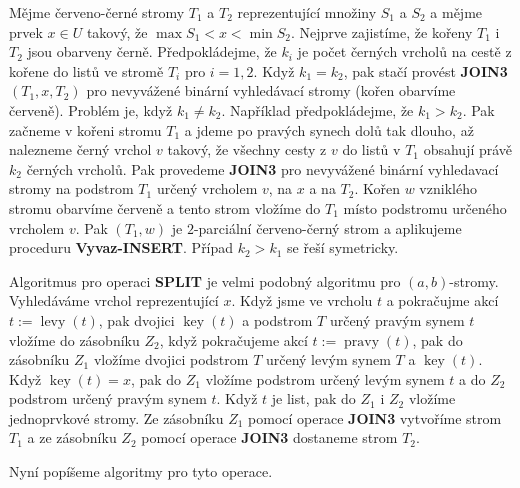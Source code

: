 \documentclass[a4paper,12pt]{article}
\DeclareMathOperator*{\levy}{levy}
\DeclareMathOperator*{\pravy}{pravy}
\DeclareMathOperator*{\key}{key}
\begin{document}
Mějme červeno-černé stromy $T_1$ a $T_2$ reprezentující 
množiny $S_1$ a $S_2$ a mějme prvek $x\in U$ takový, že 
$\max S_1<x<\min S_2$.  Nejprve zajistíme, že kořeny $T_
1$ i $T_2$ jsou 
obarveny černě.  Předpokládejme, že $k_i$ je počet černých 
vrcholů na cestě z kořene do listů ve stromě 
$T_i$ pro $i=1,2$.  Když $k_1=k_2$, pak stačí provést {\bf JOIN3$
(T_1,x,T_2)$ }
pro nevyvážené binární vyhledávací stromy (kořen obarvíme 
červeně).  Problém je, když $k_1\ne k_2$.  Například 
předpokládejme, že $k_1>k_2$.  Pak začneme v kořeni stromu $
T_1$ a 
jdeme po pravých synech dolů tak dlouho, až nalezneme 
černý vrchol $v$ takový, že všechny cesty z $v$ do listů 
v $T_1$ obsahují právě $k_2$ černých vrcholů.  Pak 
provedeme {\bf JOIN3} pro nevyvážené binární vyhledavací stromy 
na podstrom $T_1$ určený vrcholem $v$, na $x$ a na $T_2$. Kořen $
w$ 
vzniklého stromu obarvíme červeně a tento strom vložíme do 
$T_1$ místo podstromu určeného vrcholem $v$. Pak $(T_1,w
)$ je 
$2$-parciální červeno-černý strom a aplikujeme proceduru 
{\bf Vyvaz-INSERT}. Případ $k_2>k_1$ se řeší symetricky. 

Algoritmus pro operaci {\bf SPLIT} je velmi podobný 
algoritmu pro $(a,b)$-stromy. Vy\-hledává\-me vrchol 
reprezentující $x$. Když jsme ve vrcholu $t$ a pokračujme akcí 
$t:=\levy(t)$, pak dvojici $\key(t)$ a podstrom $T$ určený pravým 
synem $t$ vložíme do zásobníku $Z_2$, když pokračujeme akcí 
$t:=\pravy(t)$, pak do zásobníku $Z_1$ vložíme dvojici podstrom $
T$ 
určený levým synem $T$ a $\key(t)$. Když $\key(t)=x$, pak do $
Z_1$ 
vložíme podstrom určený levým synem $t$ a do $Z_2$ podstrom 
určený pravým synem $t$. Když $t$ je list, pak do $Z_1$ i $
Z_2$ vložíme 
jednoprvkové stromy. Ze zásobníku $Z_1$ pomocí operace {\bf JOIN3 }
vytvoříme strom $T_1$ a ze zásobníku $Z_2$ pomocí operace {\bf JOIN3 }
dostaneme strom $T_2$. 

Nyní popíšeme algoritmy pro tyto operace.
\end{document}
